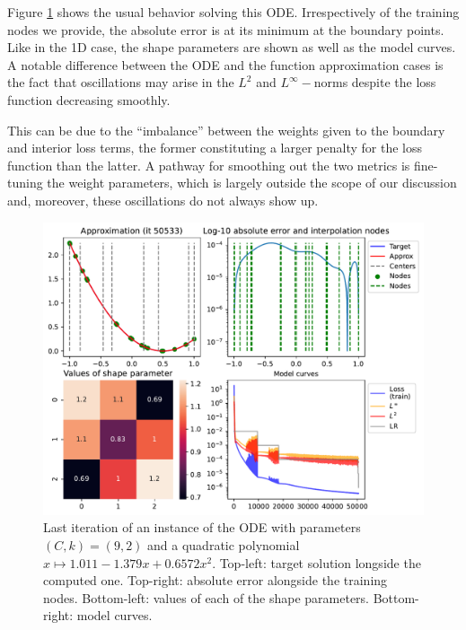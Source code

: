 \documentclass[12pt]{report} %
\begin{document}
Figure \ref{fig:ode-1d-example-training} shows the usual behavior solving this ODE. Irrespectively of the training nodes we provide, the absolute error is at its minimum at the boundary points. Like in the 1D case, the shape parameters are shown as well as the model curves. A notable difference between the ODE and the function approximation cases is the fact that oscillations may arise in the $L^2$ and $L^\infty-$norms despite the loss function decreasing smoothly. 

This can be due to the ``imbalance'' between the weights given to the boundary and interior loss terms, the former constituting a larger penalty for the loss function than the latter. A pathway for smoothing out the two metrics is fine-tuning the weight parameters, which is largely outside the scope of our discussion and, moreover, these oscillations do not always show up.

\begin{figure}[h]
  \includegraphics[width=\textwidth]{imagenes/experiments/1d/ode/TR18-C9-Kgaussian_kernel-Poly2-Sh1.25-15.csv-E50533.pdf}
  \caption{Last iteration of an instance of the ODE with parameters $(C,k)=(9,2)$ and a quadratic polynomial $x\mapsto 1.011-1.379x+0.6572x^2$. Top-left: target solution longside the computed one. Top-right: absolute error alongside the training nodes. Bottom-left: values of each of the shape parameters. Bottom-right: model curves.}
  \label{fig:ode-1d-example-training}
\end{figure}
\end{document}
